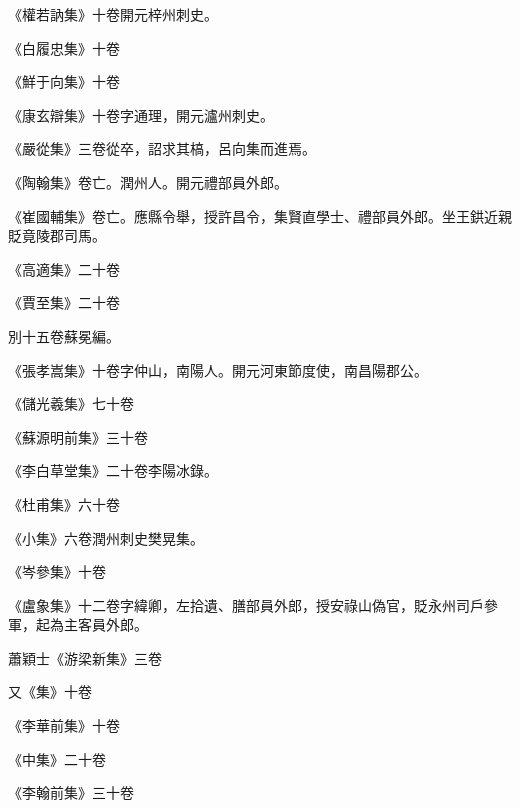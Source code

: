 \begin{pinyinscope}
 《權若訥集》十卷開元梓州刺史。



 《白履忠集》十卷



 《鮮于向集》十卷



 《康玄辯集》十卷字通理，開元瀘州刺史。



 《嚴從集》三卷從卒，詔求其槁，呂向集而進焉。



 《陶翰集》卷亡。潤州人。開元禮部員外郎。



 《崔國輔集》卷亡。應縣令舉，授許昌令，集賢直學士、禮部員外郎。坐王鉷近親貶竟陵郡司馬。



 《高適集》二十卷



 《賈至集》二十卷



 別十五卷蘇冕編。



 《張孝嵩集》十卷字仲山，南陽人。開元河東節度使，南昌陽郡公。



 《儲光羲集》七十卷



 《蘇源明前集》三十卷



 《李白草堂集》二十卷李陽冰錄。



 《杜甫集》六十卷



 《小集》六卷潤州刺史樊晃集。



 《岑參集》十卷



 《盧象集》十二卷字緯卿，左拾遺、膳部員外郎，授安祿山偽官，貶永州司戶參軍，起為主客員外郎。



 蕭穎士《游梁新集》三卷



 又《集》十卷



 《李華前集》十卷



 《中集》二十卷



 《李翰前集》三十卷




\end{pinyinscope}
